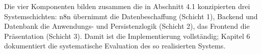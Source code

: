Die vier Komponenten bilden zusammen die in Abschnitt 4.1 konzipierten
drei Systemschichten: n8n übernimmt die Datenbeschaffung (Schicht 1),
Backend und Datenbank die Anwendungs- und Persistenzlogik (Schicht 2),
das Frontend die Präsentation (Schicht 3). Damit ist die Implementierung
vollständig; Kapitel 6 dokumentiert die systematische Evaluation des so
realisierten Systems.

